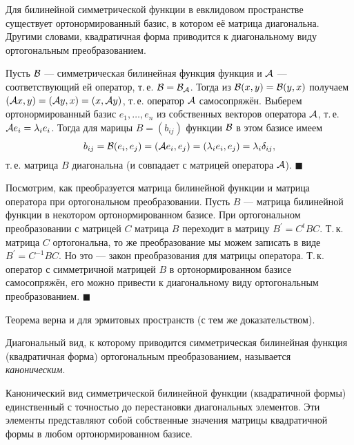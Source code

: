 \begin{theorem}
    Для билинейной симметрической функции в евклидовом пространстве существует ортонормированный базис, в котором её матрица диагональна. Другими словами, квадратичная форма приводится к диагональному виду ортогональным преобразованием.
\end{theorem}

\smallskip
{}
Пусть $\mathcal{B}$ --- симметрическая билинейная функция функция и $\mathcal{A}$ --- соответствующий ей оператор, т.\,е. $\mathcal{B} = \mathcal{B}_{\mathcal{A}}$. Тогда из $\mathcal{B}(x, y) = \mathcal{B}(y, x)$ получаем $(\mathcal{A} x, y) = (\mathcal{A} y, x) = (x, \mathcal{A} y)$, т.\,е. оператор $\mathcal{A}$ самосопряжён. Выберем ортонормированный базис $e_1, \ldots, e_n$ из собственных векторов оператора $\mathcal{A}$, т.\,е. $\mathcal{A} e_i = \lambda_ie_i$. Тогда для марицы $B = (b_{ij})$ функции $\mathcal{B}$ в этом базисе имеем
\[
    b_{ij} = \mathcal{B}(e_i, e_j) = (\mathcal{A} e_i, e_j) = (\lambda_ie_i, e_j) = \lambda_i\delta_{ij},
\]
т.\,е. матрица $B$ диагональна (и совпадает с матрицей оператора $\mathcal{A}$).
\hfill$\blacksquare$\par\smallskip

\smallskip
{}
Посмотрим, как преобразуется матрица билинейной функции и матрица оператора при ортогональном преобразовании. Пусть $B$ --- матрица билинейной функции в некотором ортонормированном базисе. При ортогональном преобразовании с матрицей $C$ матрица $B$ переходит в матрицу $B^\prime = C^tBC$. Т.\,к. матрица $C$ ортогональна, то же преобразование мы можем записать в виде $B^\prime = C^{-1}BC$. Но это --- закон преобразования для матрицы оператора. Т.\,к. оператор с симметричной матрицей $B$ в ортонормированном базисе самосопряжён, его можно привести к диагональному виду ортогональным преобразованием.
\hfill$\blacksquare$\par\smallskip

Теорема верна и для эрмитовых пространств (с тем же доказательством).

Диагональный вид, к которому приводится симметрическая билинейная функция (квадратичная форма) ортогональным преобразованием, называется \textit{каноническим}.

\begin{proposal}
    Канонический вид симметрической билинейной функции (квадратичной формы) единственный с точностью до перестановки диагональных элементов. Эти элементы представляют собой собственные значения матрицы квадратичной формы в любом ортонормированном базисе.
\end{proposal}

